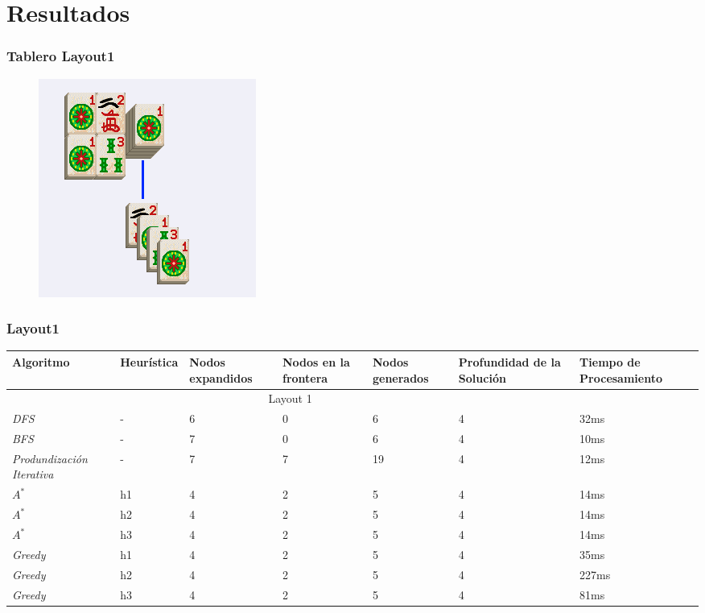 \documentclass{beamer}
\begin{document}
\section{Resultados}

\begin{frame}
\frametitle{Tablero Layout1}
\begin{figure}[hb]
	\includegraphics[scale=0.3]{../Boards/Layout1.png}
\end{figure}
\end{frame}

\begin{frame}
\frametitle{Layout1}

\tiny{
\begin{table}[h]
\begin{center}
	\begin{tabular}{|p{1.3cm}|p{1.0cm}|p{1cm}|p{1cm}|p{1cm}|p{1cm}|p{2cm}|}
	\hline
	 Algoritmo & Heur\'istica & Nodos expandidos & Nodos en la frontera & Nodos generados & Profundidad de la Soluci\'on & Tiempo de Procesamiento\\
	\hline \hline
		 \multicolumn{6}{|c|}{Layout 1} \\
	\hline
	\textit{DFS} & - & 6 & 0 & 6 & 4 & 32ms \\
	\textit{BFS} & - & 7 & 0 & 6 & 4 & 10ms \\
	\textit{Produndizaci\'on Iterativa} & - & 7 &  7 & 19 & 4 & 12ms \\
	\textit{$A^*$} & h1 & 4 & 2 & 5 & 4 & 14ms \\
	\textit{$A^*$} & h2 & 4 & 2 & 5 & 4 & 14ms \\
	\textit{$A^*$} & h3 & 4 & 2 & 5 & 4 & 14ms \\
	\textit{Greedy} & h1 & 4 & 2 & 5 & 4 & 35ms\\
	\textit{Greedy} & h2 & 4 & 2 & 5 & 4 & 227ms\\
	\textit{Greedy} & h3 & 4 & 2 & 5 & 4 & 81ms\\

	\hline
	\end{tabular}
\end{center}
\label{tab:costLayout1}
\end{table}}

\end{frame}
\end{document}

